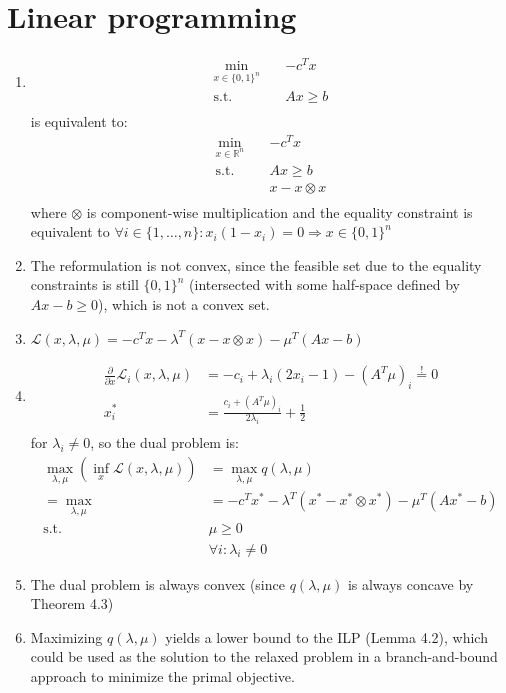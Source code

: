 \documentclass[oneside, a4paper]{book}
\newcommand\br[1]{\left(#1\right)}
\begin{document}
\section{Linear programming}
\begin{enumerate}
  \item 
  \begin{align*}
    \min_{x\in\{0,1\}^n}\quad& -c^Tx \\
    \text{s.t.}\quad& Ax\geq b \\
  \end{align*}
  is equivalent to:
  \begin{align*}
    \min_{x\in\mathds{R}^n}\quad& -c^Tx \\
    \text{s.t.}\quad& Ax\geq b \\
    & x - x\otimes x  \\
  \end{align*}
  where $\otimes$ is component-wise multiplication and the equality constraint is equivalent to $\forall i\in\{1,\dots,n\}: x_i(1-x_i) = 0 \Longrightarrow x \in \{0,1\}^n$
  \item The reformulation is not convex, since the feasible set due to the equality constraints is still $\{0,1\}^n$ (intersected with some half-space defined by $Ax-b\geq 0$), which is not a convex set.
  \item $\mathcal{L}(x,\lambda,\mu) = -c^Tx -\lambda^T (x - x\otimes x) -\mu^T (Ax-b)$
  \item  \begin{align*}
    \frac{\partial }{\partial x} \mathcal{L}_i(x,\lambda,\mu) &= -c_i + \lambda_i (2x_i - 1) -(A^T\mu)_i \overset{!}{=} 0\\
    x_i^* &= \frac{c_i + (A^T\mu)_i}{2\lambda_i} + \frac{1}{2}\\
  \end{align*} for $\lambda_i \neq 0$, so the dual problem is: \begin{align*}
    \max_{\lambda,\mu} \br{\inf_x \mathcal{L}(x,\lambda,\mu)} &= \max_{\lambda,\mu} q(\lambda,\mu)\\ = \max_{\lambda,\mu} &= -c^Tx^* -\lambda^T (x^* - x^*\otimes x^*) -\mu^T (Ax^*-b)\\
    \text{s.t.}\, & \mu \geq 0 \\
    & \forall i: \lambda_i \neq 0 
  \end{align*}
  \item The dual problem is always convex (since $q(\lambda, \mu)$ is always concave by Theorem 4.3)
  \item Maximizing $q(\lambda, \mu)$ yields a lower bound to the ILP (Lemma 4.2), which could be used as the solution to the relaxed problem in a branch-and-bound approach to minimize the primal objective.
\end{enumerate}
\end{document}

